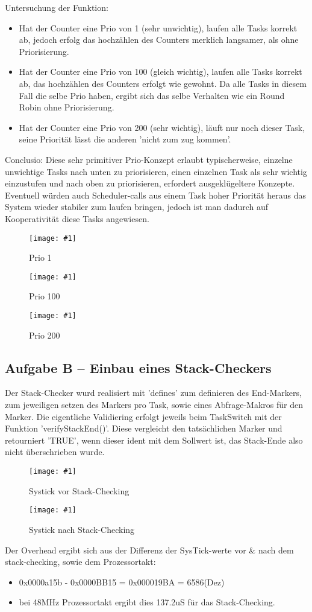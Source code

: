\documentclass{article}
\newcommand{\bild}[3]{\begin{figure}[h!]		\begin{center}			\texttt{[image: \#1]}			\caption{#2}		\end{center}	\end{figure}}
\begin{document}
Untersuchung der Funktion:
\begin{itemize}
\item Hat der Counter eine Prio von 1 (sehr unwichtig), laufen alle Tasks korrekt ab, jedoch erfolg das hochzählen des Counters merklich langsamer, als ohne Priorisierung.
\item Hat der Counter eine Prio von 100 (gleich wichtig), laufen alle Tasks korrekt ab, das hochzählen des Counters erfolgt wie gewohnt. Da alle Tasks in diesem Fall die selbe Prio haben, ergibt sich das selbe Verhalten wie ein Round Robin ohne Priorisierung.
\item Hat der Counter eine Prio von 200 (sehr wichtig), läuft nur noch dieser Task, seine Priorität lässt die anderen 'nicht zum zug kommen'.
\end{itemize}
Conclusio: Diese sehr primitiver Prio-Konzept erlaubt typischerweise, einzelne unwichtige Tasks nach unten zu priorisieren, einen einzelnen Task als sehr wichtig einzustufen und nach oben zu priorisieren, erfordert ausgeklügeltere Konzepte.
Eventuell würden auch Scheduler-calls aus einem Task hoher Priorität heraus das System wieder stabiler zum laufen bringen, jedoch ist man dadurch auf Kooperativität diese Tasks angewiesen.

\bild{BSP1_Prio_1.jpg}{Prio 1}{width=0.2\textwidth} 
\bild{BSP1_Prio_100.jpg}{Prio 100}{width=0.2\textwidth}
\bild{BSP1_Prio_200.jpg}{Prio 200}{width=0.2\textwidth}

\subsection*{Aufgabe B – Einbau eines Stack-Checkers}
Der Stack-Checker wurd realisiert mit 'defines' zum definieren des End-Markers, zum jeweiligen setzen des Markers pro Task, sowie eines Abfrage-Makros für den Marker.
Die eigentliche Validiering erfolgt jeweils beim TaskSwitch mit der Funktion 'verifyStackEnd()'. Diese vergleicht den tatsächlichen Marker und retourniert 'TRUE', wenn dieser ident mit dem Sollwert ist, das Stack-Ende also nicht überschrieben wurde.

\bild{Bsp2_pre}{Systick vor Stack-Checking}{width=0.4\textwidth}
\bild{Bsp2_post}{Systick nach Stack-Checking}{width=0.4\textwidth}

Der Overhead ergibt sich aus der Differenz der SysTick-werte vor \& nach dem stack-checking, sowie dem Prozessortakt:

\begin{itemize}
\item 0x0000a15b - 0x0000BB15 = 0x000019BA = 6586(Dez)
\item bei 48MHz Prozessortakt ergibt dies 137.2uS für das Stack-Checking.
\end{itemize}
\end{document}
